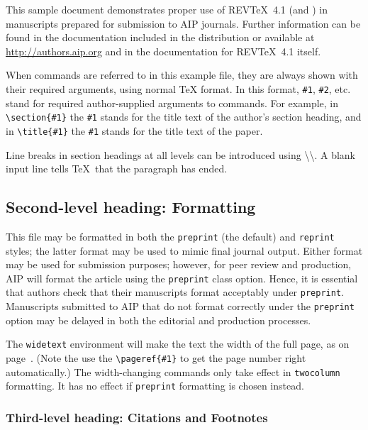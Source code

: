 \documentclass[%
 aip,
 amsmath,amssymb,
 reprint,%
]{revtex4-2}
\begin{document}
This sample document demonstrates proper use of REV\TeX~4.1 (and
\LaTeXe) in manuscripts prepared for submission to AIP
journals. Further information can be found in the documentation included in the distribution or available at
\url{http://authors.aip.org} and in the documentation for 
REV\TeX~4.1 itself.

When commands are referred to in this example file, they are always
shown with their required arguments, using normal \TeX{} format. In
this format, \verb+#1+, \verb+#2+, etc. stand for required
author-supplied arguments to commands. For example, in
\verb+\section{#1}+ the \verb+#1+ stands for the title text of the
author's section heading, and in \verb+\title{#1}+ the \verb+#1+
stands for the title text of the paper.

Line breaks in section headings at all levels can be introduced using
\textbackslash\textbackslash. A blank input line tells \TeX\ that the
paragraph has ended. 

\subsection{\label{sec:level2}Second-level heading: Formatting}

This file may be formatted in both the \texttt{preprint} (the default) and
\texttt{reprint} styles; the latter format may be used to 
mimic final journal output. Either format may be used for submission
purposes; however, for peer review and production, AIP will format the
article using the \texttt{preprint} class option. Hence, it is
essential that authors check that their manuscripts format acceptably
under \texttt{preprint}. Manuscripts submitted to AIP that do not
format correctly under the \texttt{preprint} option may be delayed in
both the editorial and production processes.

The \texttt{widetext} environment will make the text the width of the
full page, as on page~\pageref{eq:wideeq}. (Note the use the
\verb+\pageref{#1}+ to get the page number right automatically.) The
width-changing commands only take effect in \texttt{twocolumn}
formatting. It has no effect if \texttt{preprint} formatting is chosen
instead.

\subsubsection{\label{sec:level3}Third-level heading: Citations and Footnotes}
\end{document}
